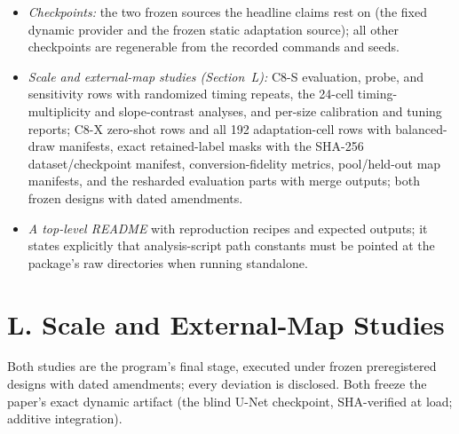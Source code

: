 \documentclass[letterpaper]{article} %
\newcommand{\stage}[1]{\textsc{#1}}
\begin{document}
\begin{itemize}
    \item \emph{Checkpoints:} the two frozen sources the headline claims rest on (the fixed dynamic provider and the frozen static adaptation source); all other checkpoints are regenerable from the recorded commands and seeds.
    \item \emph{Scale and external-map studies (Section~L):} \stage{C8-S} evaluation, probe, and sensitivity rows with randomized timing repeats, the 24-cell timing-multiplicity and slope-contrast analyses, and per-size calibration and tuning reports; \stage{C8-X} zero-shot rows and all 192 adaptation-cell rows with balanced-draw manifests, exact retained-label masks with the SHA-256 dataset/checkpoint manifest, conversion-fidelity metrics, pool/held-out map manifests, and the resharded evaluation parts with merge outputs; both frozen designs with dated amendments.
    \item \emph{A top-level README} with reproduction recipes and expected outputs; it states explicitly that analysis-script path constants must be pointed at the package's raw directories when running standalone.
\end{itemize}

\section{L. Scale and External-Map Studies}

Both studies are the program's final stage, executed under frozen
preregistered designs with dated amendments; every deviation is
disclosed. Both freeze the paper's exact dynamic artifact (the blind
U-Net checkpoint, SHA-verified at load; additive integration).
\end{document}
